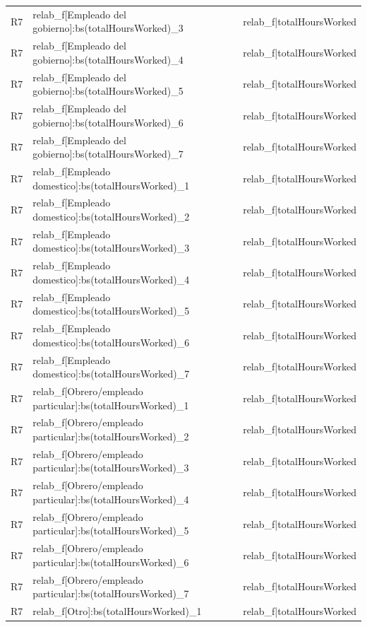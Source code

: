\begin{longtable}{lll}
R7 & relab\_f[Empleado del gobierno]:bs(totalHoursWorked)\_3 & relab\_f|totalHoursWorked \\
R7 & relab\_f[Empleado del gobierno]:bs(totalHoursWorked)\_4 & relab\_f|totalHoursWorked \\
R7 & relab\_f[Empleado del gobierno]:bs(totalHoursWorked)\_5 & relab\_f|totalHoursWorked \\
R7 & relab\_f[Empleado del gobierno]:bs(totalHoursWorked)\_6 & relab\_f|totalHoursWorked \\
R7 & relab\_f[Empleado del gobierno]:bs(totalHoursWorked)\_7 & relab\_f|totalHoursWorked \\
R7 & relab\_f[Empleado domestico]:bs(totalHoursWorked)\_1 & relab\_f|totalHoursWorked \\
R7 & relab\_f[Empleado domestico]:bs(totalHoursWorked)\_2 & relab\_f|totalHoursWorked \\
R7 & relab\_f[Empleado domestico]:bs(totalHoursWorked)\_3 & relab\_f|totalHoursWorked \\
R7 & relab\_f[Empleado domestico]:bs(totalHoursWorked)\_4 & relab\_f|totalHoursWorked \\
R7 & relab\_f[Empleado domestico]:bs(totalHoursWorked)\_5 & relab\_f|totalHoursWorked \\
R7 & relab\_f[Empleado domestico]:bs(totalHoursWorked)\_6 & relab\_f|totalHoursWorked \\
R7 & relab\_f[Empleado domestico]:bs(totalHoursWorked)\_7 & relab\_f|totalHoursWorked \\
R7 & relab\_f[Obrero/empleado particular]:bs(totalHoursWorked)\_1 & relab\_f|totalHoursWorked \\
R7 & relab\_f[Obrero/empleado particular]:bs(totalHoursWorked)\_2 & relab\_f|totalHoursWorked \\
R7 & relab\_f[Obrero/empleado particular]:bs(totalHoursWorked)\_3 & relab\_f|totalHoursWorked \\
R7 & relab\_f[Obrero/empleado particular]:bs(totalHoursWorked)\_4 & relab\_f|totalHoursWorked \\
R7 & relab\_f[Obrero/empleado particular]:bs(totalHoursWorked)\_5 & relab\_f|totalHoursWorked \\
R7 & relab\_f[Obrero/empleado particular]:bs(totalHoursWorked)\_6 & relab\_f|totalHoursWorked \\
R7 & relab\_f[Obrero/empleado particular]:bs(totalHoursWorked)\_7 & relab\_f|totalHoursWorked \\
R7 & relab\_f[Otro]:bs(totalHoursWorked)\_1 & relab\_f|totalHoursWorked \\

\end{longtable}
